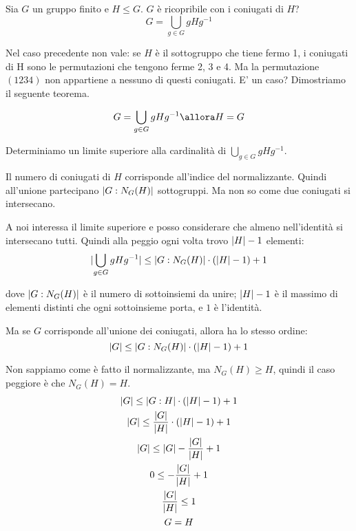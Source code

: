 Sia $G$ un gruppo finito e $H \le G$.
$G$ è ricopribile con i coniugati di $H$?
\begin{equation*}
	G = \bigcup_{g \in G} gHg^{-1}
\end{equation*}

Nel caso precedente non vale: se $H$ è il sottogruppo che tiene fermo 1, i coniugati di H sono le permutazioni che tengono
ferme 2, 3 e 4.
Ma la permutazione $(1234)$ non appartiene a nessuno di questi coniugati.
E' un caso?
Dimostriamo il seguente teorema.

\begin{teorema}
	\begin{equation*}
		G = \bigcup_{g \in G} gHg^{-1} \allora H = G
	\end{equation*}
\end{teorema}
\begin{dimostrazione}
	Determiniamo un limite superiore alla cardinalità di $\bigcup_{g \in G} gHg^{-1}$.

	Il numero di coniugati di $H$ corrisponde all'indice del normalizzante.
	Quindi all'unione partecipano $\lvert G:N_G(H) \rvert$ sottogruppi.
	Ma non so come due coniugati si intersecano.

	A noi interessa il limite superiore e posso considerare che almeno nell'identità si intersecano tutti.
	Quindi alla peggio ogni volta trovo $\lvert H \rvert - 1$ elementi:
	\begin{equation*}
		\lvert \bigcup_{g \in G} gHg^{-1} \rvert \le \lvert G:N_G(H) \rvert \cdot (\lvert H \rvert - 1) + 1
	\end{equation*}

	dove $\lvert G:N_G(H) \rvert$ è il numero di sottoinsiemi da unire; $\lvert H \rvert - 1$ è il massimo di elementi
	distinti che ogni sottoinsieme porta, e $1$ è l'identità.

	Ma se $G$ corrisponde all'unione dei coniugati, allora ha lo stesso ordine:
	\begin{equation*}
		\lvert G \rvert \le \lvert G:N_G(H) \rvert \cdot (\lvert H \rvert - 1) + 1
	\end{equation*}

	Non sappiamo come è fatto il normalizzante, ma $N_G(H) \ge H$, quindi il caso peggiore è che $N_G(H) = H$.
	\begin{gather*}
		\lvert G \rvert \le \lvert G:H \rvert \cdot (\lvert H \rvert - 1) + 1 \\
		\lvert G \rvert \le \dfrac{\lvert G \rvert}{\lvert H \rvert} \cdot (\lvert H \rvert - 1) + 1 \\
		\lvert G \rvert \le \lvert G \rvert - \dfrac{\lvert G \rvert}{\lvert H \rvert} + 1 \\
		0 \le - \dfrac{\lvert G \rvert}{\lvert H \rvert} + 1 \\
		\dfrac{\lvert G \rvert}{\lvert H \rvert} \le 1 \\
		G = H
	\end{gather*}
\end{dimostrazione}



